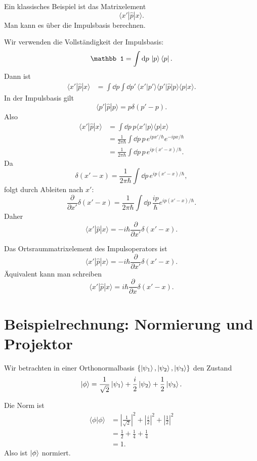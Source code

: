Ein klassisches Beispiel ist das Matrixelement
\[
    \langle x'|\hat p|x\rangle.
\]
Man kann es über die Impulsbasis berechnen.

\begin{derivationbox}
Wir verwenden die Vollständigkeit der Impulsbasis:
\[
    \mathbb 1=\int\dd p\,\ket p\bra p.
\]
Dann ist
\[
\begin{aligned}
    \langle x'|\hat p|x\rangle
    &=\int\dd p\int\dd p'\,
      \langle x'|p'\rangle\langle p'|\hat p|p\rangle\langle p|x\rangle.
\end{aligned}
\]
In der Impulsbasis gilt
\[
    \langle p'|\hat p|p\rangle=p\delta(p'-p).
\]
Also
\[
\begin{aligned}
    \langle x'|\hat p|x\rangle
    &=\int\dd p\,p\langle x'|p\rangle\langle p|x\rangle \\
    &=\frac{1}{2\pi\hbar}\int\dd p\,p\,e^{ipx'/\hbar}e^{-ipx/\hbar} \\
    &=\frac{1}{2\pi\hbar}\int\dd p\,p\,e^{ip(x'-x)/\hbar}.
\end{aligned}
\]
Da
\[
    \delta(x'-x)=\frac{1}{2\pi\hbar}\int\dd p\,e^{ip(x'-x)/\hbar},
\]
folgt durch Ableiten nach $x'$:
\[
    \frac{\partial}{\partial x'}\delta(x'-x)
    =\frac{1}{2\pi\hbar}\int\dd p\,\frac{ip}{\hbar}e^{ip(x'-x)/\hbar}.
\]
Daher
\[
    \langle x'|\hat p|x\rangle
    =-i\hbar\frac{\partial}{\partial x'}\delta(x'-x).
\]
\end{derivationbox}

\begin{formulabox}
Das Ortsraummatrixelement des Impulsoperators ist
\[
    \langle x'|\hat p|x\rangle
    =-i\hbar\frac{\partial}{\partial x'}\delta(x'-x).
\]
Äquivalent kann man schreiben
\[
    \langle x'|\hat p|x\rangle
    =i\hbar\frac{\partial}{\partial x}\delta(x'-x).
\]
\end{formulabox}

\section{Beispielrechnung: Normierung und Projektor}

Wir betrachten in einer Orthonormalbasis $\{\left|\psi_1\right\rangle,\left|\psi_2\right\rangle,\left|\psi_3\right\rangle\}$ den Zustand
\[
    \left|\phi\right\rangle=\frac{1}{\sqrt2}\left|\psi_1\right\rangle+\frac{i}{2}\left|\psi_2\right\rangle+\frac12\left|\psi_3\right\rangle.
\]

\begin{calculationbox}
Die Norm ist
\[
\begin{aligned}
    \langle\phi|\phi\rangle
    &=\left|\frac1{\sqrt2}\right|^2+\left|\frac i2\right|^2+\left|\frac12\right|^2 \\
    &=\frac12+\frac14+\frac14 \\
    &=1.
\end{aligned}
\]
Also ist $\left|\phi\right\rangle$ normiert.
\end{calculationbox}

